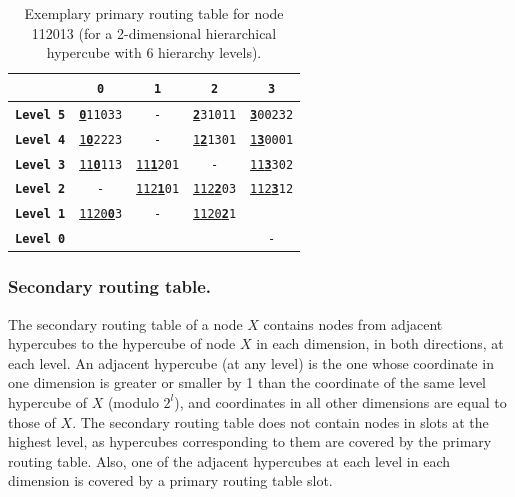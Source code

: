 \begin{table}
\scriptsize
\begin{center}
\begin{tabular}{c|c|c|c|c|}
	\hhline{*{1}{~}*{4}{|-}|~|}
																				& \texttt{\textbf{0}}									& \texttt{\textbf{1}}											& \texttt{\textbf{2}}											& \texttt{\textbf{3}}										\\
    \hline
    \multicolumn{1}{|c|}{\texttt{\textbf{Level 5}}}								& \texttt{\underline{\textbf{0}}11033}					& \texttt{-}													& \texttt{\underline{\textbf{2}}31011}							& \texttt{\underline{\textbf{3}}00232}						\\
	\multicolumn{1}{|c|}{\texttt{\textbf{Level 4}}}								& \texttt{\underline{1\textbf{0}}2223}					& \texttt{-}													& \texttt{\underline{1\textbf{2}}1301}							& \texttt{\underline{1\textbf{3}}0001}						\\
	\multicolumn{1}{|c|}{\texttt{\textbf{Level 3}}}								& \texttt{\underline{11\textbf{0}}113}					& \texttt{\underline{11\textbf{1}}201}							& \texttt{-}													& \texttt{\underline{11\textbf{3}}302}						\\
	\multicolumn{1}{|c|}{\texttt{\textbf{Level 2}}}								& \texttt{-}											& \texttt{\underline{112\textbf{1}}01}							& \texttt{\underline{112\textbf{2}}03}							& \texttt{\underline{112\textbf{3}}12}						\\
	\multicolumn{1}{|c|}{\texttt{\textbf{Level 1}}}								& \texttt{\underline{1120\textbf{0}}3}					& \texttt{-}													& \texttt{\underline{1120\textbf{2}}1}							& 															\\
	\multicolumn{1}{|c|}{\texttt{\textbf{Level 0}}}								& 														& 																& 																& \texttt{-}												\\
    \hline
\end{tabular}
\end{center}
\caption{Exemplary primary routing table for node 112013 (for a 2-dimensional hierarchical hypercube with 6 hierarchy levels).}
\label{tab:rt1Example}
\end{table}




\subsubsection{Secondary routing table.}

The secondary routing table of a node $X$ contains nodes from adjacent hypercubes to the hypercube of node $X$ in each dimension, in both directions, at each level. An adjacent hypercube (at any level) is the one whose coordinate in one dimension is greater or smaller by 1 than the coordinate of the same level hypercube of $X$ (modulo $2^l$), and coordinates in all other dimensions are equal to those of $X$. The secondary routing table does not contain nodes in slots at the highest level, as hypercubes corresponding to them are covered by the primary routing table. Also, one of the adjacent hypercubes at each level in each dimension is covered by a primary routing table slot.

